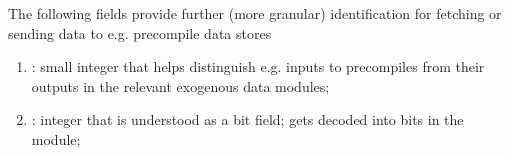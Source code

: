 The following fields provide further (more granular) identification for fetching or sending data to e.g. precompile data stores 
\begin{enumerate}[resume]
	\item \macroPhase{}:
		small integer that helps distinguish e.g. inputs to precompiles from their outputs in the relevant exogenous data modules;
	\item \macroExoSum{}:
		integer that is understood as a bit field;
		gets decoded into bits in the \mmioMod{} module;
\end{enumerate}
